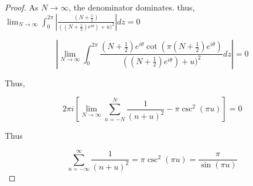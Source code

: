 \documentclass{article}
\newcommand{\abs}[1]{\left\lvert #1\right\rvert}
\newcommand*{\lm}[1]{\lim_{#1 \to \infty}}
\begin{document}
\begin{proof}
    As $N \to \infty$, the denominator dominates. thus, $\lim_{N \to \infty} \int_{0}^{2 \pi} \abs{\frac{(N + \frac{1}{2})}{((N + \frac{1}{2})e^{i \theta}) + u)^2}} dz = 0$ 
    
    \begin{equation}
        \abs{\lim_{N \to \infty}  \int_{0}^{2 \pi} \frac{(N + \frac{1}{2})e^{i \theta} \cot(\pi (N + \frac{1}{2})e^{i \theta})}{((N + \frac{1}{2})e^{i \theta}) + u)^2} dz} = 0
    \end{equation}

    Thus, 

    \begin{equation*}
        2 \pi i \left[\lm{N}\sum_{n = -N}^{N} \frac{1}{(n + u)^2} -\pi \csc^2(\pi u)\right] = 0
    \end{equation*}

    Thus

    \begin{equation*}
        \sum_{n = -\infty}^{\infty} \frac{1}{(n + u)^2} = \pi \csc^2(\pi u) = \frac{\pi}{\sin(\pi u)}
    \end{equation*}
\end{proof}
\end{document}
